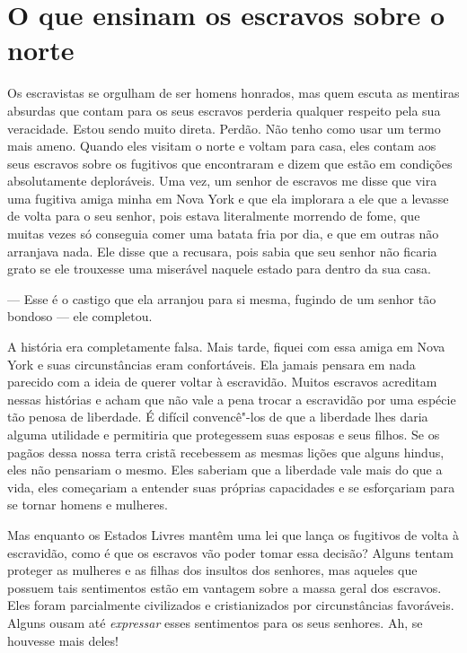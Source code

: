 \chapter*{O que ensinam os escravos sobre o norte}


Os escravistas se orgulham de ser
homens honrados, mas quem escuta as mentiras absurdas que contam para os
seus escravos perderia qualquer respeito pela sua veracidade. Estou
sendo muito direta. Perdão. Não tenho como usar um termo mais ameno.
Quando eles visitam o norte e voltam para casa, eles contam aos seus
escravos sobre os fugitivos que encontraram e dizem que estão em
condições absolutamente deploráveis. Uma vez, um senhor de escravos me
disse que vira uma fugitiva amiga minha em Nova York e que ela implorara
a ele que a levasse de volta para o seu senhor, pois estava literalmente
morrendo de fome, que muitas vezes só conseguia comer uma batata fria
por dia, e que em outras não arranjava nada. Ele disse que a recusara,
pois sabia que seu senhor não ficaria grato se ele trouxesse uma
miserável naquele estado para dentro da sua casa.

--- Esse é o castigo que ela arranjou para si mesma, fugindo de um
senhor tão bondoso --- ele completou.

A história era completamente falsa.
Mais tarde, fiquei com essa amiga em Nova York e suas circunstâncias
eram confortáveis. Ela jamais pensara em nada parecido com a ideia de
querer voltar à escravidão. Muitos escravos acreditam nessas histórias e
acham que não vale a pena trocar a escravidão por uma espécie tão penosa
de liberdade. É difícil convencê"-los de que a liberdade lhes daria
alguma utilidade e permitiria que protegessem suas esposas e seus
filhos. Se os pagãos dessa nossa terra cristã recebessem as mesmas
lições que alguns hindus, eles não pensariam o mesmo. Eles saberiam que
a liberdade vale mais do que a vida, eles começariam a entender suas
próprias capacidades e se esforçariam para se tornar homens e mulheres.

Mas enquanto os Estados Livres mantêm
uma lei que lança os fugitivos de volta à escravidão, como é que os
escravos vão poder tomar essa decisão? Alguns tentam proteger as
mulheres e as filhas dos insultos dos senhores, mas aqueles que possuem
tais sentimentos estão em vantagem sobre a massa geral dos escravos.
Eles foram parcialmente civilizados e cristianizados por circunstâncias
favoráveis. Alguns ousam até \emph{expressar} esses sentimentos para os
seus senhores. Ah, se houvesse mais deles!

